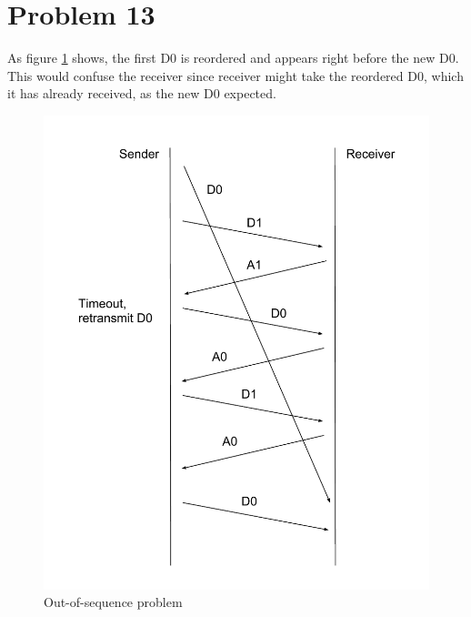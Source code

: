 \documentclass[titlepage, paper=a4, fontsize=11pt]{scrartcl} %
\numberwithin{equation}{section} %
\numberwithin{table}{section} %
\begin{document}

\section*{Problem 13}
As figure \ref{fig:p13} shows, the first D0 is reordered and appears right before the new D0.
This would confuse the receiver since receiver might take the reordered D0, which it has already received,
as the new D0 expected.
\begin{figure}[!ht]
    \includegraphics[width=\textwidth]{images/P13.pdf}
    \caption{Out-of-sequence problem}
    \label{fig:p13}
\end{figure}
\\


\end{document}
